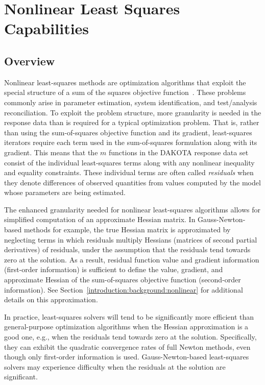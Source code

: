 \chapter{Nonlinear Least Squares Capabilities}\label{nls}

\section{Overview}\label{nls:overview}

Nonlinear least-squares methods are optimization algorithms that
exploit the special structure of a sum of the squares objective
function~\cite{Gil81}. These problems commonly arise in parameter
estimation, system identification, and test/analysis reconciliation.
To exploit the problem structure, more granularity is needed
in the response data than is required for a typical optimization
problem.  That is, rather than using the sum-of-squares objective
function and its gradient, least-squares iterators require each term
used in the sum-of-squares formulation along with its gradient. This
means that the $m$ functions in the DAKOTA response data set consist
of the individual least-squares terms along with any nonlinear
inequality and equality constraints. These individual terms are often
called \emph{residuals} when they denote differences of
observed quantities from values computed by the model whose parameters
are being estimated.

The enhanced granularity needed for nonlinear least-squares algorithms
allows for simplified computation of an approximate Hessian matrix.
In Gauss-Newton-based methods for example, the true Hessian matrix is
approximated by neglecting terms in which residuals multiply
Hessians (matrices of second
partial derivatives) of residuals,
under the assumption that the residuals tend towards zero at
the solution. As a result, residual function value and gradient
information (first-order information) is sufficient to define the
value, gradient, and approximate Hessian of the sum-of-squares
objective function (second-order information). See
Section~\ref{introduction:background:nonlinear} for additional details
on this approximation.

In practice, least-squares solvers will tend to be significantly more
efficient than general-purpose optimization algorithms when the
Hessian approximation is a good one, e.g., when the residuals tend
towards zero at the solution. Specifically, they can exhibit the
quadratic convergence rates of full Newton methods, even though only
first-order information is used. Gauss-Newton-based least-squares
solvers may experience difficulty when the residuals at the solution
are significant.

